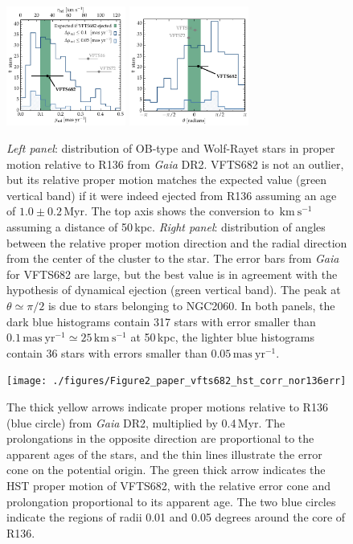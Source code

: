 \documentclass[a4paper,fleqn,usenatbib]{mnras}
\newcommand{\kms}{{\,\mathrm{km\ s^{-1}}}}
\begin{document}
\vspace*{10pt}%
\begin{figure}[tbp]
  \centering
  \includegraphics[width=0.35\textwidth]{figures/dist_mu_region.pdf}
  \includegraphics[width=0.35\textwidth]{figures/angle}
  \caption{\emph{Left panel}: distribution of OB-type and Wolf-Rayet stars in proper
    motion relative to R136 from \emph{Gaia} DR2. VFTS682 is not an outlier, but
    its relative proper motion matches the expected value (green
    vertical band) if it were indeed
    ejected from R136 assuming an age of $1.0\pm0.2$\,Myr. The top axis shows the conversion to $\kms$
    assuming a distance of 50\,kpc. \emph{Right panel}:  distribution of
    angles between the relative proper motion direction and the radial
    direction from the center of the cluster to the star. The error bars from \emph{Gaia} for VFTS682 are large, but
    the best value is in agreement with the hypothesis of dynamical
    ejection (green vertical band). The peak at $\theta\simeq\pi/2$ is due to stars
    belonging to NGC2060. In both
    panels, the dark blue histograms contain 317 
    stars with error smaller than $0.1\,\mathrm{mas \
      yr^{-1}}\simeq25\,\mathrm{km\ s^{-1}}$ at 50\,kpc, the
    lighter blue histograms contain 36 stars with errors smaller than $0.05\,\mathrm{mas \
      yr^{-1}}$. }
  \label{fig:dist}
\end{figure}


\begin{figure}%
  \centering
  \texttt{[image: ./figures/Figure2\_paper\_vfts682\_hst\_corr\_nor136err]}  
  \caption{The thick yellow arrows indicate proper motions relative to
    R136 (blue
    circle) from \emph{Gaia} DR2, multiplied by 0.4\,Myr. The prolongations in the opposite
    direction are proportional to the apparent ages of the stars, and
    the thin lines illustrate the error cone on the potential
    origin. The green thick arrow
    indicates the HST proper motion of VFTS682, with the relative
    error cone and prolongation proportional to its apparent
    age. The two blue circles indicate the regions of radii 0.01 and 0.05
    degrees around the core of R136.}
  
  \label{fig:main}
\end{figure}
\end{document}
